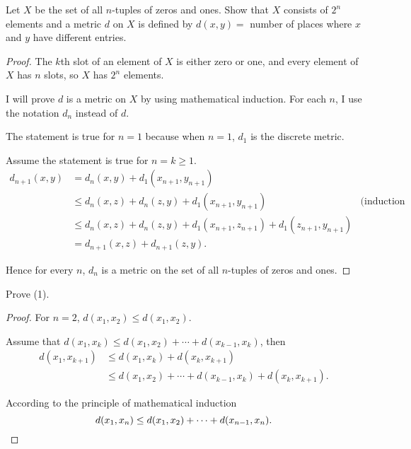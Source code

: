 \begin{exercise}\label{chapter1:section1:exercise10}
    Let $X$ be the set of all $n$-tuples of zeros and ones. Show that $X$ consists of $2^{n}$ elements and a metric $d$ on $X$ is defined by $d(x, y) =$ number of places where $x$ and $y$ have different entries.
\end{exercise}

\begin{proof}
    The $k$th slot of an element of $X$ is either zero or one, and every element of $X$ has $n$ slots, so $X$ has $2^{n}$ elements.

    I will prove $d$ is a metric on $X$ by using mathematical induction. For each $n$, I use the notation $d_{n}$ instead of $d$.

    The statement is true for $n = 1$ because when $n = 1$, $d_{1}$ is the discrete metric.

    Assume the statement is true for $n = k\geq 1$.
    \begin{align*}
        d_{n+1}(x, y) & = d_{n}(x, y) + d_{1}(x_{n+1}, y_{n+1})                                                                            \\
                      & \leq d_{n}(x, z) + d_{n}(z, y) + d_{1}(x_{n+1}, y_{n+1})                           & \text{(induction hypothesis)} \\
                      & \leq d_{n}(x, z) + d_{n}(z, y) + d_{1}(x_{n+1}, z_{n+1}) + d_{1}(z_{n+1}, y_{n+1})                                 \\
                      & = d_{n+1}(x, z) + d_{n+1}(z, y).
    \end{align*}

    Hence for every $n$, $d_{n}$ is a metric on the set of all $n$-tuples of zeros and ones.
\end{proof}

\begin{exercise}\label{chapter1:section1:exercise11}
    Prove (1).
\end{exercise}

\begin{proof}
    For $n = 2$, $d(x_{1}, x_{2})\leq d(x_{1}, x_{2})$.

    Assume that $d(x_{1}, x_{k})\leq d(x_{1}, x_{2}) + \cdots + d(x_{k-1}, x_{k})$, then
    \begin{align*}
        d(x_{1}, x_{k+1}) & \leq d(x_{1}, x_{k}) + d(x_{k}, x_{k+1})                               \\
                          & \leq d(x_{1}, x_{2}) + \cdots + d(x_{k-1}, x_{k}) + d(x_{k}, x_{k+1}).
    \end{align*}

    According to the principle of mathematical induction
    \[
        d(x_{1}, x_{n}) \leq d(x_{1}, x_{2}) + \cdots + d(x_{n-1}, x_{n}).\qedhere
    \]
\end{proof}

